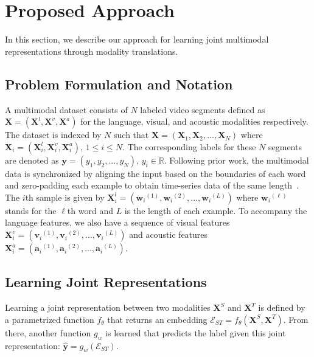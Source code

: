 \documentclass[letterpaper]{article} %
\newcommand{\citep}{\cite}
\begin{document}
\section{Proposed Approach}\label{sec:PROPAPR}

In this section, we describe our approach for learning joint multimodal representations through modality translations.

\subsection{Problem Formulation and Notation}

A multimodal dataset consists of $N$ labeled video segments defined as $\mathbf{X} = (\mathbf{X}^{l}, \mathbf{X}^{v}, \mathbf{X}^{a})$ for the language, visual, and acoustic modalities respectively. The dataset is indexed by $N$ such that $\mathbf{X} = (\mathbf{X}_1, \mathbf{X}_2, ..., \mathbf{X}_N)$ where $\mathbf{X}_i = ({\mathbf{X}_i^{l}}, {\mathbf{X}_i^v}, {\mathbf{X}_i^a}), \, 1 \leq i \leq N$. The corresponding labels for these $N$ segments are denoted as $\mathbf{y}=(y_1, y_2, ..., y_N), \, y_i \in \mathbb{R}$. 
Following prior work, the multimodal data is 
synchronized by aligning the input based on the boundaries of each word and zero-padding each example to obtain time-series data of the same length~\citep{multistage}. The $i$th 
sample
is given by ${\mathbf{X}_i^l} = ({\mathbf{w}_i}^{(1)}, {\mathbf{w}_i}^{(2)}, ..., {\mathbf{w}_i}^{(L)})$ where ${\mathbf{w}_i}^{(\ell)}$ stands for the $\ell$th word and $L$ is the length of each example. To accompany the language features, we also have a sequence of visual features ${\mathbf{X}_i^v} = ({\mathbf{v}_i}^{(1)}, {\mathbf{v}_i}^{(2)}, ..., {\mathbf{v}_i}^{(L)})$ and acoustic features ${\mathbf{X}_i^a} = ({\mathbf{a}_i}^{(1)}, {\mathbf{a}_i}^{(2)}, ..., {\mathbf{a}_i}^{(L)})$.

\subsection{Learning Joint Representations}

Learning a joint representation between two modalities $\mathbf{X}^{S}$ and $\mathbf{X}^{T}$ 
is defined by 
a parametrized function $f_{\theta}$ that returns an embedding $\mathcal{E}_{ST} = f_{\theta}(\mathbf{X}^{S},\mathbf{X}^{T})$. From there, another function $g_{w}$ is learned that predicts the label given this joint representation: $\hat{\mathbf{y}} = g_w(\mathcal{E}_{ST})$.
\end{document}
